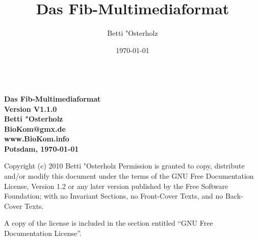 \documentclass[11pt,a4paper]{article}
\begin{document}
\setlength{\unitlength}{1cm} %

\title{Das Fib-Multimediaformat}
\author{Betti "Osterholz}
\date{\today}

\begin{titlepage}
	\begin{center}
	\ \vspace{2.5cm} \\
	\Huge\bf Das Fib-Multimediaformat\\\vspace{0.5cm}
	\LARGE Version V1.1.0\\\vspace{2cm}
	\LARGE Betti "Osterholz\\\vspace{0.5cm}
	\large BioKom@gmx.de\\\vspace{0.5cm}
	\large www.BioKom.info\\\vspace{0.5cm}
	Potsdam, \today\\\vspace{5.5cm}
	\end{center}
	
	\noindent
Copyright (c) 2010  Betti "Osterholz
\newline\newline
Permission is granted to copy, distribute and/or modify this document under the terms of the GNU Free Documentation License, Version 1.2 or any later version published by the Free Software Foundation; with no Invariant Sections, no Front-Cover Texts, and no Back-Cover Texts.

A copy of the license is included in the section entitled "`GNU Free Documentation License"'.
\end{titlepage}

\renewcommand{\sectionmark}[1]{\markboth{#1}{}}
\pagestyle{scrheadings} %
\setheadsepline{0.4pt}
\ihead{} %
\ohead{} %
\chead{\slshape \headmark}  %
\cfoot{\thepage} %


\ihead{\slshape \headmark } %
\ohead{}
\chead{}
\clearpage
\end{document}
